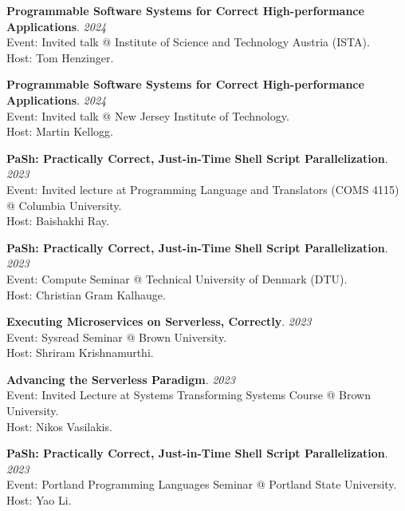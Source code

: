 \begin{minipage}{\textwidth}
\textbf{Programmable Software Systems for Correct High-performance Applications}. \hfill {\em 2024}\\
Event: Invited talk @ Institute of Science and Technology Austria (ISTA).\\
 Host: Tom Henzinger.
\end{minipage}

\begin{minipage}{\textwidth}
\textbf{Programmable Software Systems for Correct High-performance Applications}. \hfill {\em 2024}\\
Event: Invited talk @ New Jersey Institute of Technology.\\
 Host: Martin Kellogg.
\end{minipage}

\begin{minipage}{\textwidth}
\textbf{PaSh: Practically Correct, Just-in-Time Shell Script Parallelization}. \hfill {\em 2023}\\
Event: Invited lecture at Programming Language and Translators (COMS 4115) @ Columbia University.\\
 Host: Baishakhi Ray.
\end{minipage}

\begin{minipage}{\textwidth}
\textbf{PaSh: Practically Correct, Just-in-Time Shell Script Parallelization}. \hfill {\em 2023}\\
Event: Compute Seminar @ Technical University of Denmark (DTU).\\
 Host: Christian Gram Kalhauge.
\end{minipage}

\begin{minipage}{\textwidth}
\textbf{Executing Microservices on Serverless, Correctly}. \hfill {\em 2023}\\
Event: Sysread Seminar @ Brown University.\\
 Host: Shriram Krishnamurthi.
\end{minipage}

\begin{minipage}{\textwidth}
\textbf{Advancing the Serverless Paradigm}. \hfill {\em 2023}\\
Event: Invited Lecture at Systems Transforming Systems Course @ Brown University.\\
 Host: Nikos Vasilakis.
\end{minipage}

\begin{minipage}{\textwidth}
\textbf{PaSh: Practically Correct, Just-in-Time Shell Script Parallelization}. \hfill {\em 2023}\\
Event: Portland Programming Languages Seminar @ Portland State University.\\
 Host: Yao Li.
\end{minipage}

